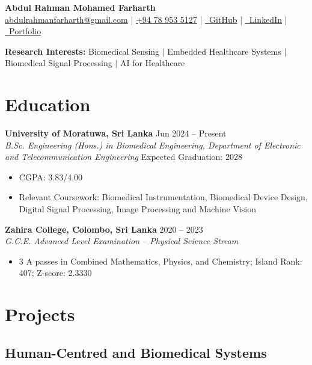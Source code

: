 \documentclass[10pt,a4paper]{article}
\begin{document}
\begin{center}
{\LARGE\textbf{Abdul Rahman Mohamed Farharth}}\\[4pt]
\href{mailto:abdulrahmanfarharth@gmail.com}{abdulrahmanfarharth@gmail.com}
\;|\;
\href{tel:+94789535127}{+94 78 953 5127}
\;|\;
\href{https://github.com/Abdul-Rahman-bme}{\faGithub\ GitHub}
\;|\;
\href{https://www.linkedin.com/in/abdulrahmanmf/}{\faLinkedin\ LinkedIn}
\;|\;
\href{https://abdul-rahman-bme.github.io/}{\faGlobe\ Portfolio}
\end{center}
\textbf{Research Interests:} Biomedical Sensing $\vert$ Embedded Healthcare Systems $\vert$ Biomedical Signal Processing $\vert$ AI for Healthcare

\section*{Education}

\textbf{University of Moratuwa, Sri Lanka}
\hfill Jun 2024 -- Present\\
\textit{B.Sc. Engineering (Hons.) in Biomedical Engineering,
Department of Electronic and Telecommunication Engineering}
\hfill Expected Graduation: 2028
\begin{itemize}
    \item CGPA: 3.83/4.00
    \item Relevant Coursework: Biomedical Instrumentation, Biomedical Device Design, Digital Signal Processing, Image Processing and Machine Vision
\end{itemize}

\textbf{Zahira College, Colombo, Sri Lanka}
\hfill 2020 -- 2023\\
\textit{G.C.E. Advanced Level Examination -- Physical Science Stream}
\begin{itemize}
    \item 3 A passes in Combined Mathematics, Physics, and Chemistry; Island Rank: 407; Z-score: 2.3330
\end{itemize}

\section*{Projects}

\subsection*{Human-Centred and Biomedical Systems}
\end{document}
